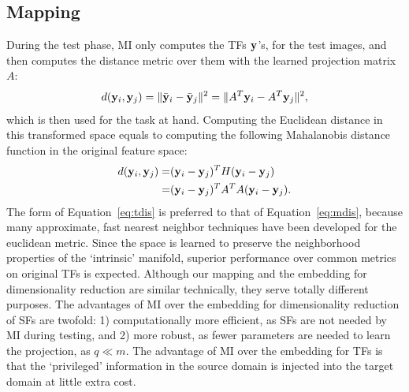 
\subsection{Mapping}
During the test phase, MI only computes the TFs ${{\mathbf y}}$'s, for the
test images, and then computes the distance metric over them with the 
learned projection matrix $A$:
\begin{equation}
  \label{eq:tdis}
  d({{\mathbf y}}_i, {{\mathbf y}}_j) = \|\bar{{\mathbf y}}_i - \bar{{\mathbf y}}_j\|^2 = \|A^T{{\mathbf y}}_i - A^T{{\mathbf y}}_j\|^2, 
\end{equation}
which is then used for the task at hand. Computing the Euclidean
distance in this transformed space equals to computing the following
Mahalanobis distance function in the original feature space: 
%
 \begin{align}
\label{eq:mdis}
  d({{\mathbf y}}_i, {{\mathbf y}}_j) = &({{\mathbf y}}_i - {{\mathbf y}}_j )^T H ({{\mathbf y}}_i - {{\mathbf y}}_j)  \nonumber \\
                           = & ({{\mathbf y}}_i - {{\mathbf y}}_j )^T A^TA ({{\mathbf y}}_i - {{\mathbf y}}_j).  
 \end{align}
%
 The form of Equation~\ref{eq:tdis} is preferred to that of
 Equation~\ref{eq:mdis}, because many approximate, fast nearest neighbor
 techniques have been developed for the euclidean metric. Since the
 space is learned to preserve the neighborhood properties of the
 `intrinsic' manifold, superior performance over common metrics on
 original TFs is expected.  Although our mapping and the embedding for
 dimensionality reduction are similar technically, they serve totally
 different purposes. The advantages of MI over the embedding for
 dimensionality reduction of SFs are twofold: 1) computationally more
 efficient, as SFs are not needed by MI during testing, and 2) more
 robust, as fewer parameters are needed to learn the projection, as $q
 \ll m$. The advantage of MI over the embedding for TFs is that the
 `privileged' information in the source domain is injected into the target
 domain at little extra cost.





